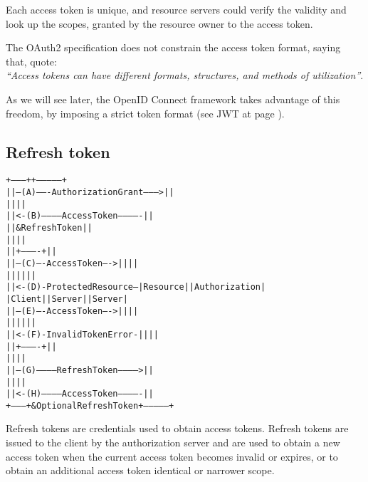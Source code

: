 \documentclass[11pt]{style}
\begin{document}
Each access token is unique, and resource servers could verify the validity and
look up the scopes, granted by the resource owner to the access token.

The OAuth2 specification does not constrain the access token format, saying
that, quote: \\
\textit{``Access tokens can have different formats, structures, and methods of
utilization''}.

As we will see later, the OpenID Connect framework takes advantage of this
freedom, by imposing a strict token format (see JWT at page \pageref{jwt}).

\subsection{Refresh token}
\begin{alltt}
  +--------+                                           +---------------+
  |        |--(A)------- Authorization Grant --------->|               |
  |        |                                           |               |
  |        |<-(B)----------- Access Token -------------|               |
  |        |               & Refresh Token             |               |
  |        |                                           |               |
  |        |                            +----------+   |               |
  |        |--(C)---- Access Token ---->|          |   |               |
  |        |                            |          |   |               |
  |        |<-(D)- Protected Resource --| Resource |   | Authorization |
  | Client |                            |  Server  |   |     Server    |
  |        |--(E)---- Access Token ---->|          |   |               |
  |        |                            |          |   |               |
  |        |<-(F)- Invalid Token Error -|          |   |               |
  |        |                            +----------+   |               |
  |        |                                           |               |
  |        |--(G)----------- Refresh Token ----------->|               |
  |        |                                           |               |
  |        |<-(H)----------- Access Token -------------|               |
  +--------+           & Optional Refresh Token        +---------------+
\end{alltt}

Refresh tokens are credentials used to obtain access tokens. Refresh tokens are
issued to the client by the authorization server and are used to obtain a new
access token when the current access token becomes invalid or expires, or to
obtain an additional access token identical or narrower scope.
\end{document}
